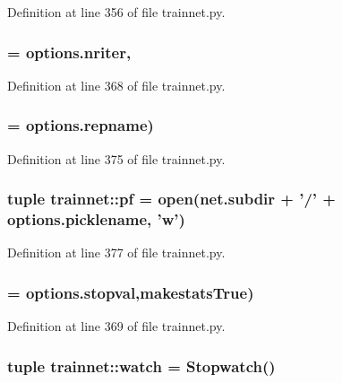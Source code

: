 Definition at line 356 of file trainnet.py.

\hypertarget{namespacetrainnet_a531ebfd51f4947ab5422381d729a8756}{
\subsubsection[{niterations}]{ = options.nriter,}}
\label{namespacetrainnet_a531ebfd51f4947ab5422381d729a8756}


Definition at line 368 of file trainnet.py.

\hypertarget{namespacetrainnet_a3e3b093ef37c5ac35ebdcbfc08bf52e1}{
\subsubsection[{ofname}]{ = options.repname)}}
\label{namespacetrainnet_a3e3b093ef37c5ac35ebdcbfc08bf52e1}


Definition at line 375 of file trainnet.py.

\hypertarget{namespacetrainnet_aacdb2e9555d0d0aa59e25c64e45d48b2}{
\subsubsection[{pf}]{\setlength{\rightskip}{0pt plus 5cm}tuple {\bf trainnet::pf} = open(net.subdir + '/' + options.picklename, 'w')}}
\label{namespacetrainnet_aacdb2e9555d0d0aa59e25c64e45d48b2}


Definition at line 377 of file trainnet.py.

\hypertarget{namespacetrainnet_a8c0014c8c751971aa9ac67420b64d9a5}{
\subsubsection[{stopval}]{ = options.stopval,makestatsTrue)}}
\label{namespacetrainnet_a8c0014c8c751971aa9ac67420b64d9a5}


Definition at line 369 of file trainnet.py.

\hypertarget{namespacetrainnet_a53e6fa3504764aa1a0d61b916af6358a}{
\subsubsection[{watch}]{\setlength{\rightskip}{0pt plus 5cm}tuple {\bf trainnet::watch} = Stopwatch()}}
\label{namespacetrainnet_a53e6fa3504764aa1a0d61b916af6358a}


